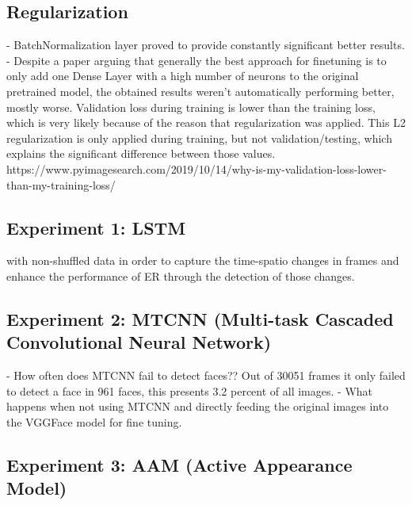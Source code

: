 \subsection{Regularization}
- BatchNormalization layer proved to provide constantly significant better results.
- Despite a paper\cite{Pittaras:2017:FineTuningStrategiesComparison} arguing that generally the best approach for finetuning is to only add one Dense Layer with a high number of neurons to the original pretrained model, the obtained results weren't automatically performing better, mostly worse.
\newline\newline
Validation loss during training is lower than the training loss, which is very likely because of the reason that regularization was applied. This L2 regularization is only applied during training, but not validation/testing, which explains the significant difference between those values.
https://www.pyimagesearch.com/2019/10/14/why-is-my-validation-loss-lower-than-my-training-loss/

\subsection{Experiment 1: LSTM}
with non-shuffled data in order to capture the time-spatio changes in frames and enhance the performance of ER through the detection of those changes.

\subsection{Experiment 2: MTCNN (Multi-task Cascaded Convolutional Neural Network)}
- How often does MTCNN fail to detect faces??
Out of 30051 frames it only failed to detect a face in 961 faces, this presents 3.2 percent of all images.
\newline\newline
- What happens when not using MTCNN and directly feeding the original images into the VGGFace model for fine tuning.

\subsection{Experiment 3: AAM (Active Appearance Model)}




